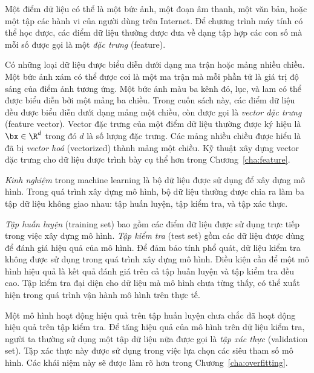 Một điểm dữ liệu có thể là một bức ảnh, một đoạn âm thanh, một văn bản, hoặc một
tập các hành vi của người dùng trên Internet. Để chương trình máy tính có thể
học được, các điểm dữ liệu thường được đưa về dạng tập hợp các con số mà mỗi số
được gọi là một \textit{đặc trưng} (feature).


Có những loại dữ liệu được biểu diễn dưới dạng ma trận hoặc mảng nhiều chiều.
Một bức ảnh xám có thể được coi là một ma trận mà mỗi phần tử là giá trị độ sáng
của điểm ảnh tương ứng. Một bức ảnh màu ba kênh đỏ, lục, và lam có thể được biểu
diễn bởi một mảng ba chiều. Trong cuốn sách này, các điểm dữ liệu đều được biểu
diễn dưới dạng mảng một chiều, còn được gọi là \textit{vector đặc trưng} (feature vector). Vector đặc trưng của một điểm dữ liệu thường được ký hiệu là $\bx \in \R^d$ trong đó $d$ là số lượng đặc trưng. Các mảng nhiều chiều được hiểu là đã bị \textit{vector hoá} (vectorized) thành mảng một chiều. Kỹ thuật xây dựng vector đặc trưng cho dữ liệu được trình bày cụ thể hơn trong Chương~\ref{cha:feature}.

\textit{Kinh nghiệm} trong machine learning là bộ dữ liệu được sử dụng để xây
dựng mô hình. Trong quá trình xây dựng mô hình, bộ dữ liệu thường được chia ra
làm ba tập dữ liệu không giao nhau: tập huấn luyện, tập kiểm tra, và tập xác thực.




\textit{Tập huấn luyện} (training set) bao gồm các điểm dữ liệu được sử dụng trực tiếp trong việc xây dựng mô hình. \textit{Tập kiểm tra} (test set) gồm các dữ liệu được dùng để đánh giá hiệu quả của mô hình. Để đảm bảo tính phổ quát, dữ liệu kiểm tra không được sử dụng trong quá trình xây dựng mô hình. Điều kiện cần để một mô hình hiệu quả là kết quả đánh giá trên cả tập huấn luyện và tập kiểm tra đều cao. Tập kiểm tra đại diện cho dữ liệu mà mô hình chưa từng thấy, có thể xuất hiện trong quá trình vận hành mô hình trên thực tế. 

Một mô hình hoạt động hiệu quả trên tập huấn luyện chưa chắc đã hoạt động hiệu quả trên tập kiểm tra. Để tăng hiệu quả của mô hình trên dữ liệu kiểm tra, người ta thường sử dụng một tập dữ liệu nữa được gọi là \textit{tập xác thực} (validation set). Tập xác thực này được sử dụng trong việc lựa chọn các siêu tham số mô hình. Các khái niệm này sẽ được làm rõ hơn trong Chương~\ref{cha:overfitting}. 
 


